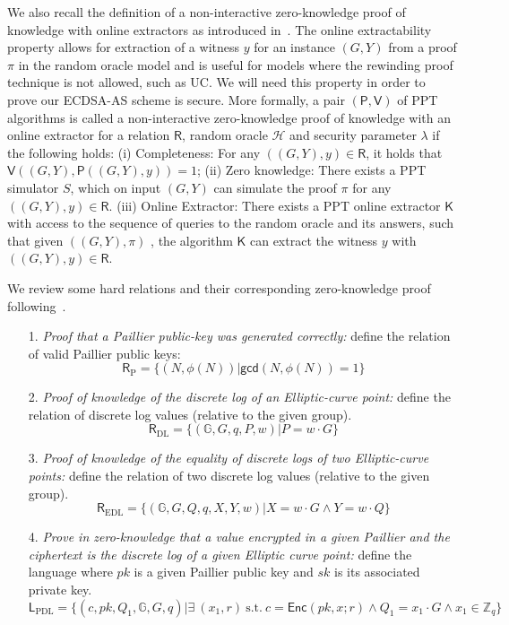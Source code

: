 \documentclass{llncs}
\begin{document}
We also recall the definition of a non-interactive zero-knowledge proof of knowledge with online extractors as introduced in~\cite{Fischlin05}. The online extractability property allows for extraction of a witness $y$ for an instance $(G,Y)$ from a proof $\pi$ in the random oracle model and is useful for models where the rewinding proof technique is not allowed, such as UC. We will need this property in order to prove our ECDSA-AS scheme is secure. More formally, a pair $(\mathsf{P}, \mathsf{V})$ of PPT algorithms is called a non-interactive zero-knowledge proof of knowledge with an online extractor for a relation $\mathsf{R}$, random oracle $\mathcal{H}$ and security parameter $\lambda$ if the following holds: (i) Completeness: For any $((G,Y),y) \in \mathsf{R}$, it holds that $\mathsf{V}((G,Y), \mathsf{P}((G,Y), y)) = 1$; (ii) Zero knowledge: There exists a PPT simulator $S$, which on input $(G,Y)$ can simulate the proof $\pi$ for any $((G,Y),y) \in \mathsf{R}$. (iii) Online Extractor: There exists a PPT online extractor $\mathsf{K}$ with access to the sequence of queries to the random oracle and its answers, such that given $((G,Y),\pi)$ , the algorithm $\mathsf{K}$ can extract the witness $y$ with $((G,Y),y) \in \mathsf{R}$. 

We review some hard relations and their corresponding zero-knowledge proof following~\cite{Lin17}.
\begin{itemize}
\item[1.]\emph{Proof that a Paillier public-key was generated correctly:} define the relation of valid Paillier public keys: 
$$\mathsf{R}_{\text{P}} = \{(N,\phi(N)) | \mathsf{gcd}(N,\phi(N)) = 1\}$$
\item[2.]\emph{Proof of knowledge of the discrete log of an Elliptic-curve point:} define the
relation of discrete log values (relative to the given group).
$$\mathsf{R}_{\text{DL}} =\{(\mathbb{G},G,q,P,w)|P =w\cdot G\} $$
\item[3.]\emph{Proof of knowledge of the equality of discrete logs of two Elliptic-curve points:} define the relation of two discrete log values (relative to the given group).
$$\mathsf{R}_{\text{EDL}} =\{(\mathbb{G},G,Q,q,X,Y,w)|X =w\cdot G\wedge Y=w\cdot Q\} $$
\item[4.]\emph{Prove in zero-knowledge that a value encrypted in a given Paillier and the ciphertext is the discrete log of a given Elliptic curve point:} define the language where $pk$ is a given Paillier public key and $sk$ is its associated private key.
$$\mathsf{L}_{\text{PDL}} = \{(c,pk,Q_1,\mathbb{G},G,q) | \exists\  (x_1,r)\ \text{s.t.}\ c=\mathsf{Enc}(pk,x;r)\wedge Q_1 =x_1\cdot G \wedge x_1 \in \mathbb{Z}_q\}$$

\end{itemize}
\end{document}
